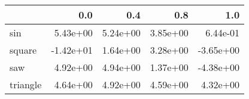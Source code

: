 \begin{tabular}{lrrrr}
\toprule
{} &       0.0 &      0.4 &      0.8 &       1.0 \\
\midrule
sin      &  5.43e+00 & 5.24e+00 & 3.85e+00 &  6.44e-01 \\
square   & -1.42e+01 & 1.64e+00 & 3.28e+00 & -3.65e+00 \\
saw      &  4.92e+00 & 4.94e+00 & 1.37e+00 & -4.38e+00 \\
triangle &  4.64e+00 & 4.92e+00 & 4.59e+00 &  4.32e+00 \\
\bottomrule
\end{tabular}
